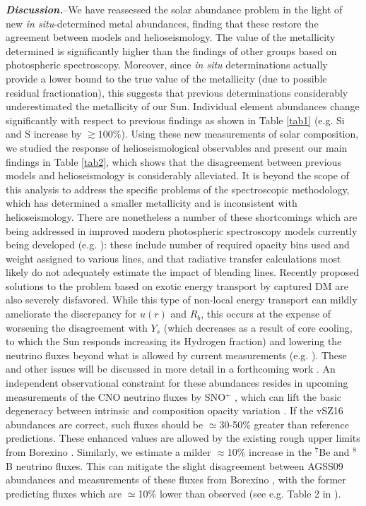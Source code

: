 \documentclass[aps,prl,twocolumn,showpacs]{revtex4}
\begin{document}
\textbf{\textit{Discussion.\/}}\---We have reassessed the solar abundance problem in the light of new \textit{in situ}-determined metal abundances, finding that these restore the  agreement between models and helioseismology. The value of the metallicity determined is significantly higher than the findings of other groups based on photospheric spectroscopy. Moreover, since \textit{in situ} determinations actually provide a lower bound to the true value of the metallicity (due to possible residual fractionation), this suggests that previous determinations considerably underestimated the metallicity of our Sun. Individual element abundances change significantly with respect to previous findings as shown in Table \ref{tab1} (e.g. Si and S increase by $\gtrsim 100\%$). Using these new measurements of solar composition, we studied the response of helioseismological observables and present our main findings in Table \ref{tab2}, which shows that the disagreement between previous models and helioseismology is considerably alleviated. \newline \indent
%
It is beyond the scope of this analysis to address the specific problems of the spectroscopic methodology, which has determined a smaller metallicity and is inconsistent with helioseismology. There are nonetheless a number of these shortcomings which are being addressed in improved modern photospheric spectroscopy models currently being developed (e.g. \cite{caffau}): these include number of required opacity bins used and weight assigned to various lines, and that radiative transfer calculations most likely do not adequately estimate the impact of blending lines. \newline \indent
%
Recently proposed solutions to the problem based on exotic energy transport by captured DM are also severely disfavored. While this type of non-local energy transport can mildly ameliorate the discrepancy for $u(r)$ and $R_b$, this occurs at the expense of worsening the disagreement with $Y_s$ (which decreases as a result of core cooling, to which the Sun responds increasing its Hydrogen fraction) and lowering the neutrino fluxes beyond what is allowed by current measurements (e.g. \cite{vogel}). These and other issues will be discussed in more detail in a forthcoming work \cite{fssv}. \newline \indent
%
An independent observational constraint for these abundances resides in upcoming measurements of the CNO neutrino fluxes by SNO$^+$ \cite{sno}, which can lift the basic degeneracy between intrinsic and composition opacity variation \cite{villante1,villante2}. If the vSZ16 abundances are correct, such fluxes should be $\simeq$30-50$\%$ greater than reference predictions. These enhanced values are allowed by the existing rough upper limits from Borexino \cite{borexinophase1}. Similarly, we estimate a milder $\approx$10\% increase in the $^7$Be and $^8$B neutrino fluxes. This can mitigate the slight disagreement between AGSS09 abundances and measurements of these fluxes from Borexino \cite{be7,b8}, with the former predicting fluxes which are $\simeq$10\% lower than observed (see e.g. Table 2 in \cite{villante3}). \newline \indent
\end{document}
